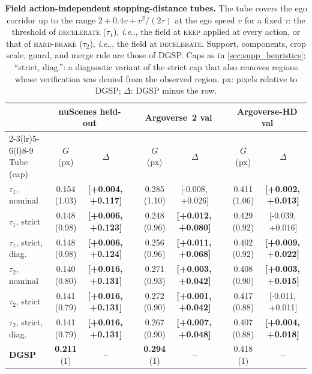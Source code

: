 \documentclass[10pt,letterpaper]{article}
\makeatletter
\DeclareRobustCommand\onedot{\futurelet\@let@token\@onedot}
\def\@onedot{\ifx\@let@token.\else.\null\fi\xspace}
\def\ie{\emph{i.e}\onedot} \def\Ie{\emph{I.e}\onedot}
\newcommand{\method}{DGSP\xspace}
\newcommand{\G}{G}
\newcommand{\ci}[2]{[#1,\allowbreak\,#2]}
\newcommand{\best}[1]{\textbf{#1}}
\newcommand{\oursrow}{\rowcolor{oursbg}}
\newcommand{\na}{--}
\theoremstyle{remark}
\theoremstyle{plain}
\theoremstyle{definition}
\makeatother
\begin{document}
\begin{table}[!htbp]
\centering
\caption{\textbf{Field \vs action-independent stopping-distance tubes.} The tube covers the ego corridor up to the range $2+0.4v+v^2/(2\tau)$ at the ego speed $v$ for a fixed $\tau$: the threshold of \textsc{decelerate} ($\tau_1$), \ie, the field at \textsc{keep} applied at every action, or that of \textsc{hard-brake} ($\tau_2$), \ie, the field at \textsc{decelerate}. Support, components, crop scale, guard, and merge rule are those of \method. Caps as in \cref{sec:supp_heuristics}; ``strict, diag.'': a diagnostic variant of the strict cap that also removes regions whose verification was denied from the observed region. px: pixels relative to \method; $\Delta$: \method minus the row.}
\label{tab:speedtube}
\small
\setlength{\tabcolsep}{2.4pt}
\begin{tabular}{@{}lcccccccc@{}}
\toprule
 & \multicolumn{2}{c}{nuScenes held-out} & & \multicolumn{2}{c}{Argoverse~2 val} & & \multicolumn{2}{c}{Argoverse-HD val} \\
\cmidrule(lr){2-3}\cmidrule(lr){5-6}\cmidrule(l){8-9}
Tube (cap) & $\G$ (px) & $\Delta$ & & $\G$ (px) & $\Delta$ & & $\G$ (px) & $\Delta$ \\
\midrule
$\tau_1$, nominal & 0.154 (1.03) & \best{\ci{+0.004}{+0.117}} & & 0.285 (1.10) & \ci{-0.008}{+0.026} & & 0.411 (1.06) & \best{\ci{+0.002}{+0.013}} \\
$\tau_1$, strict & 0.148 (0.98) & \best{\ci{+0.006}{+0.123}} & & 0.248 (0.96) & \best{\ci{+0.012}{+0.080}} & & 0.429 (0.92) & \ci{-0.039}{+0.016} \\
$\tau_1$, strict, diag. & 0.148 (0.98) & \best{\ci{+0.006}{+0.124}} & & 0.256 (0.96) & \best{\ci{+0.011}{+0.068}} & & 0.402 (0.92) & \best{\ci{+0.009}{+0.022}} \\
$\tau_2$, nominal & 0.140 (0.80) & \best{\ci{+0.016}{+0.131}} & & 0.271 (0.93) & \best{\ci{+0.003}{+0.042}} & & 0.408 (0.90) & \best{\ci{+0.003}{+0.015}} \\
$\tau_2$, strict & 0.141 (0.79) & \best{\ci{+0.016}{+0.131}} & & 0.272 (0.90) & \best{\ci{+0.001}{+0.042}} & & 0.417 (0.88) & \ci{-0.011}{+0.011} \\
$\tau_2$, strict, diag. & 0.141 (0.79) & \best{\ci{+0.016}{+0.131}} & & 0.267 (0.90) & \best{\ci{+0.007}{+0.048}} & & 0.407 (0.88) & \best{\ci{+0.004}{+0.018}} \\
\midrule
\oursrow \textbf{\method} & \textbf{0.211} (1) & \na & & \textbf{0.294} (1) & \na & & 0.418 (1) & \na \\
\bottomrule
\end{tabular}
\end{table}
\end{document}
